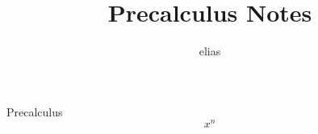 \documentclass{article}
\title{Precalculus Notes}
\author{elias}
\begin{document}
\maketitle
Precalculus
\[ x^n\]
\end{document}
